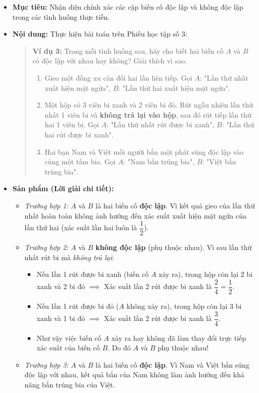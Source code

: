 \documentclass[12pt, a4paper]{article}
\begin{document}
\begin{itemize}[leftmargin=1.2cm]
    \item[a)] \textbf{Mục tiêu:} Nhận diện chính xác các cặp biến cố độc lập và không độc lập trong các tình huống thực tiễn.
    \item[b)] \textbf{Nội dung:} Thực hiện bài toán trên Phiếu học tập số 3:
    \begin{quote}
        \textbf{Ví dụ 3:} Trong mỗi tình huống sau, hãy cho biết hai biến cố $A$ và $B$ có độc lập với nhau hay không? Giải thích vì sao.
        \begin{enumerate}[leftmargin=0.6cm]
            \item Gieo một đồng xu cân đối hai lần liên tiếp. Gọi $A$: "Lần thứ nhất xuất hiện mặt ngửa", $B$: "Lần thứ hai xuất hiện mặt ngửa".
            \item Một hộp có 3 viên bi xanh và 2 viên bi đỏ. Rút ngẫu nhiên lần thứ nhất 1 viên bi và \textbf{không trả lại vào hộp}, sau đó rút tiếp lần thứ hai 1 viên bi. Gọi $A$: "Lần thứ nhất rút được bi xanh", $B$: "Lần thứ hai rút được bi xanh".
            \item Hai bạn Nam và Việt mỗi người bắn một phát súng độc lập vào cùng một tấm bia. Gọi $A$: "Nam bắn trúng bia", $B$: "Việt bắn trúng bia".
        \end{enumerate}
    \end{quote}

    \item[c)] \textbf{Sản phẩm (Lời giải chi tiết):}
    \begin{itemize}[leftmargin=0.6cm]
        \item \textit{Trường hợp 1:} $A$ và $B$ là hai biến cố \textbf{độc lập}. Vì kết quả gieo của lần thứ nhất hoàn toàn không ảnh hưởng đến xác suất xuất hiện mặt ngửa của lần thứ hai (xác suất lần hai luôn là $\dfrac{1}{2}$).
        \item \textit{Trường hợp 2:} $A$ và $B$ \textbf{không độc lập} (phụ thuộc nhau). Vì sau lần thứ nhất rút bi mà \textit{không trả lại}:
        \begin{itemize}
            \item Nếu lần 1 rút được bi xanh (biến cố $A$ xảy ra), trong hộp còn lại 2 bi xanh và 2 bi đỏ $\implies$ Xác suất lần 2 rút được bi xanh là $\dfrac{2}{4} = \dfrac{1}{2}$.
            \item Nếu lần 1 rút được bi đỏ ($A$ không xảy ra), trong hộp còn lại 3 bi xanh và 1 bi đỏ $\implies$ Xác suất lần 2 rút được bi xanh là $\dfrac{3}{4}$.
            \item Như vậy việc biến cố $A$ xảy ra hay không đã làm thay đổi trực tiếp xác suất của biến cố $B$. Do đó $A$ và $B$ phụ thuộc nhau!
        \end{itemize}
        \item \textit{Trường hợp 3:} $A$ và $B$ là hai biến cố \textbf{độc lập}. Vì Nam và Việt bắn súng độc lập với nhau, kết quả bắn của Nam không làm ảnh hưởng đến khả năng bắn trúng bia của Việt.
    \end{itemize}


\end{itemize}
\end{document}
